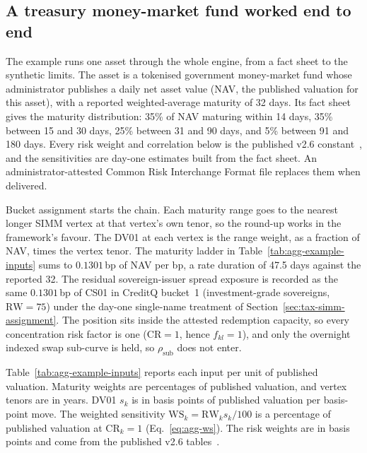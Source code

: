 \subsection{A treasury money-market fund worked end to end}\label{sec:agg-example}
The example runs one asset through the whole engine, from a fact sheet to the
synthetic limits. The asset is a tokenised government money-market fund whose
administrator publishes a daily net asset value (NAV, the published valuation for this
asset), with a reported weighted-average maturity of 32 days. Its fact sheet gives the
maturity distribution: 35\% of NAV maturing within 14 days, 35\% between 15 and 30
days, 25\% between 31 and 90 days, and 5\% between 91 and 180 days. Every risk weight
and correlation below is the published v2.6 constant~\cite{isda_simm_v2_6}, and the
sensitivities are day-one estimates built from the fact sheet. An administrator-attested
Common Risk Interchange Format file replaces them when delivered.

Bucket assignment starts the chain. Each maturity range goes to the nearest longer
SIMM vertex at that vertex's own tenor, so the round-up works in the framework's
favour. The DV01 at each vertex is the range weight, as a fraction of NAV, times the
vertex tenor. The maturity ladder in Table~\ref{tab:agg-example-inputs} sums to
$0.1301$\,bp of NAV per bp, a rate duration of 47.5 days against the reported 32.
The residual sovereign-issuer spread exposure is recorded as the same $0.1301$\,bp of CS01 in
CreditQ bucket~1 (investment-grade sovereigns, $\mathrm{RW}=75$) under the day-one
single-name treatment of Section~\ref{sec:tax-simm-assignment}. The position sits inside
the attested redemption capacity, so every concentration risk factor is one
($\mathrm{CR}=1$, hence $f_{kl}=1$), and only the overnight indexed swap sub-curve is
held, so $\rho_{\mathrm{sub}}$ does not enter.

Table~\ref{tab:agg-example-inputs} reports each input per unit of published valuation. Maturity weights are percentages of published valuation, and vertex tenors are in years. DV01 $s_k$ is in basis points of published valuation per basis-point move. The weighted sensitivity $\mathrm{WS}_k=\mathrm{RW}_k s_k/100$ is a percentage of published valuation at $\mathrm{CR}_k=1$ (Eq.~\eqref{eq:agg-ws}). The risk weights are in basis points and come from the published v2.6 tables~\cite{isda_simm_v2_6}.

